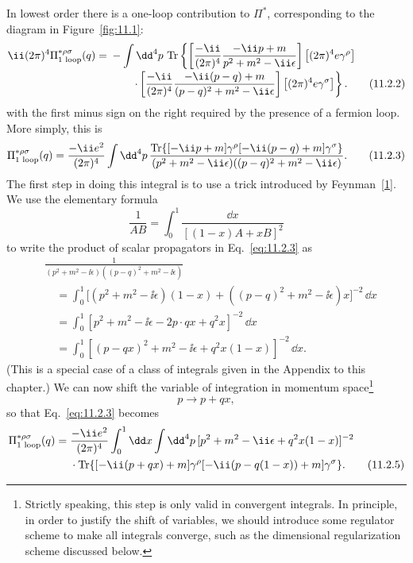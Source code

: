 In lowest order there is a one-loop contribution to $\Pi^*$, corresponding
to the diagram in Figure~\ref{fig:11.1}:
\begin{align}
  \ii(2\pi)^4\Pi_{\text{1 loop}}^{*\rho\sigma}(q)
  ={}&-\int \dd^4p\,\operatorname{Tr}\left\{
  \left[\frac{-\ii}{(2\pi)^4}\frac{-\ii\sl{p}+m}{p^2+m^2-\ii\epsilon}\right]
  \left[(2\pi)^4e\gamma^\rho\right]
  \right.\notag\\[-2pt]
  &\left.\qquad\cdot
  \left[\frac{-\ii}{(2\pi)^4}
  \frac{-\ii(\sl{p}-\sl{q})+m}{(p-q)^2+m^2-\ii\epsilon}\right]
  \left[(2\pi)^4e\gamma^\sigma\right]\right\}.
  \tag{11.2.2}\label{eq:11.2.2}
\end{align}
with the first minus sign on the right required by the presence of a fermion
loop. More simply, this is
\begin{equation}
  \Pi_{\text{1 loop}}^{*\rho\sigma}(q)
  =\frac{-\ii e^2}{(2\pi)^4}\int \dd^4p\,
  \frac{\operatorname{Tr}\{[-\ii\sl{p}+m]\gamma^\rho
  [-\ii(\sl{p}-\sl{q})+m]\gamma^\sigma\}}
  {(p^2+m^2-\ii\epsilon)((p-q)^2+m^2-\ii\epsilon)}.
  \tag{11.2.3}\label{eq:11.2.3}
\end{equation}
The first step in doing this integral is to use a trick introduced by
Feynman~\hyperref[ref:11.1]{[1]}. We use the elementary formula
\begin{equation}
  \frac1{AB}=\int_0^1\frac{\dd x}{[(1-x)A+xB]^2}
  \tag{11.2.4}\label{eq:11.2.4}
\end{equation}
to write the product of scalar propagators in Eq.~\eqref{eq:11.2.3} as
\begin{align*}
  &\frac1{(p^2+m^2-\ii\epsilon)((p-q)^2+m^2-\ii\epsilon)}\\
  &\quad=\int_0^1\bigl[(p^2+m^2-\ii\epsilon)(1-x)
  +((p-q)^2+m^2-\ii\epsilon)x\bigr]^{-2}\,\dd x\\
  &\quad=\int_0^1[p^2+m^2-\ii\epsilon-2p\cdot qx+q^2x]^{-2}\,\dd x\\
  &\quad=\int_0^1[(p-qx)^2+m^2-\ii\epsilon+q^2x(1-x)]^{-2}\,\dd x.
\end{align*}
(This is a special case of a class of integrals given in the Appendix to
this chapter.) We can now shift the variable of integration in momentum
space\footnote{Strictly speaking, this step is only valid in convergent integrals.
In principle, in order to justify the shift of variables, we should introduce
some regulator scheme to make all integrals converge, such as the dimensional
regularization scheme discussed below.}
\[
  p\longrightarrow p+qx,
\]
so that Eq.~\eqref{eq:11.2.3} becomes
\begin{align}
  \Pi_{\text{1 loop}}^{*\rho\sigma}(q)
  ={}&\frac{-\ii e^2}{(2\pi)^4}\int_0^1\dd x\int \dd^4p\,
  [p^2+m^2-\ii\epsilon+q^2x(1-x)]^{-2}\notag\\
  &\cdot\operatorname{Tr}\{[-\ii(\sl{p}+\sl{q}x)+m]\gamma^\rho
  [-\ii(\sl{p}-\sl{q}(1-x))+m]\gamma^\sigma\}.
  \tag{11.2.5}\label{eq:11.2.5}
\end{align}
